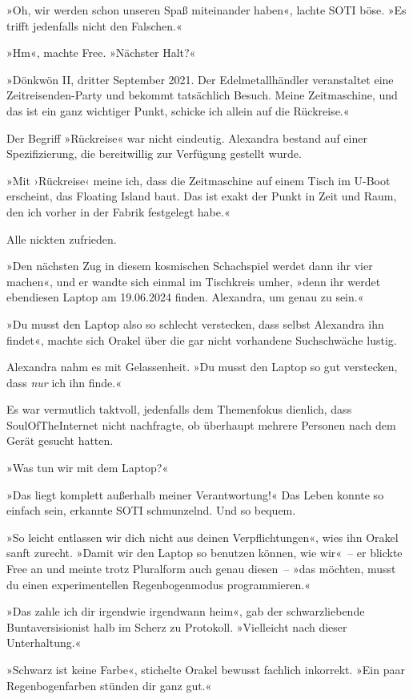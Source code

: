 »Oh, wir werden schon unseren Spaß miteinander haben«, lachte SOTI böse. »Es trifft jedenfalls nicht den Falschen.«

»Hm«, machte Free. »Nächster Halt?«

»Dönkwön II, dritter September 2021. Der Edelmetallhändler veranstaltet eine Zeitreisenden-Party und bekommt tatsächlich Besuch. Meine Zeitmaschine, und das ist ein ganz wichtiger Punkt, schicke ich allein auf die Rückreise.«

Der Begriff »Rückreise« war nicht eindeutig. Alexandra bestand auf einer Spezifizierung, die bereitwillig zur Verfügung gestellt wurde.

»Mit ›Rückreise‹ meine ich, dass die Zeitmaschine auf einem Tisch im U-Boot erscheint, das Floating Island baut. Das ist exakt der Punkt in Zeit und Raum, den ich vorher in der Fabrik festgelegt habe.«

Alle nickten zufrieden.

»Den nächsten Zug in diesem kosmischen Schachspiel werdet dann ihr vier machen«, und er wandte sich einmal im Tischkreis umher, »denn ihr werdet ebendiesen Laptop am 19.06.2024 finden. Alexandra, um genau zu sein.«

»Du musst den Laptop also so schlecht verstecken, dass selbst Alexandra ihn findet«, machte sich Orakel über die gar nicht vorhandene Suchschwäche lustig.

Alexandra nahm es mit Gelassenheit. »Du musst den Laptop so gut verstecken, dass \emph{nur} ich ihn finde.«

Es war vermutlich taktvoll, jedenfalls dem Themenfokus dienlich, dass SoulOfTheInternet nicht nachfragte, ob überhaupt mehrere Personen nach dem Gerät gesucht hatten.

»Was tun wir mit dem Laptop?«

»Das liegt komplett außerhalb meiner Verantwortung!« Das Leben konnte so einfach sein, erkannte SOTI schmunzelnd. Und so bequem.

»So leicht entlassen wir dich nicht aus deinen Verpflichtungen«, wies ihn Orakel sanft zurecht. »Damit wir den Laptop so benutzen können, wie wir«~– er blickte Free an und meinte trotz Pluralform auch genau diesen~– »das möchten, musst du einen experimentellen Regenbogenmodus programmieren.«

»Das zahle ich dir irgendwie irgendwann heim«, gab der schwarzliebende Buntaversisionist halb im Scherz zu Protokoll. »Vielleicht nach dieser Unterhaltung.«

»Schwarz ist keine Farbe«, stichelte Orakel bewusst fachlich inkorrekt. »Ein paar Regenbogenfarben stünden dir ganz gut.«

